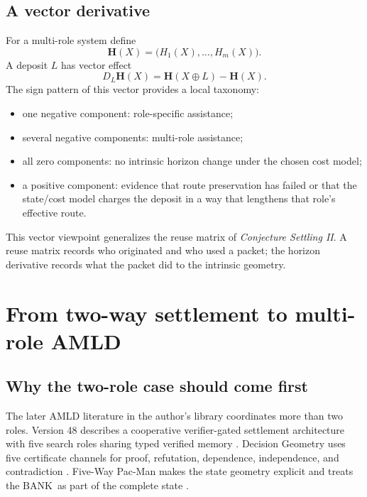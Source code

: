 \documentclass[11pt]{article}
\theoremstyle{remark}
\newcommand{\BANK}{\ensuremath{\mathrm{BANK}}}
\begin{document}
\subsection{A vector derivative}

For a multi-role system define
\[
\mathbf H(X)=\bigl(H_1(X),\ldots,H_m(X)\bigr).
\]
A deposit $L$ has vector effect
\[
D_L\mathbf H(X)=\mathbf H(X\oplus L)-\mathbf H(X).
\]
The sign pattern of this vector provides a local taxonomy:
\begin{itemize}
\item one negative component: role-specific assistance;
\item several negative components: multi-role assistance;
\item all zero components: no intrinsic horizon change under the chosen cost model;
\item a positive component: evidence that route preservation has failed or that the state/cost model charges the deposit in a way that lengthens that role's effective route.
\end{itemize}

This vector viewpoint generalizes the reuse matrix of \emph{Conjecture Settling II}. A reuse matrix records who originated and who used a packet; the horizon derivative records what the packet did to the intrinsic geometry.

\section{From two-way settlement to multi-role AMLD}

\subsection{Why the two-role case should come first}

The later AMLD literature in the author's library coordinates more than two roles. Version 48 describes a cooperative verifier-gated settlement architecture with five search roles sharing typed verified memory \cite{TennesonDepths48}. Decision Geometry uses five certificate channels for proof, refutation, dependence, independence, and contradiction \cite{TennesonAMLDII}. Five-Way Pac-Man makes the state geometry explicit and treats the \BANK\ as part of the complete state \cite{TennesonPacMan}.
\end{document}
